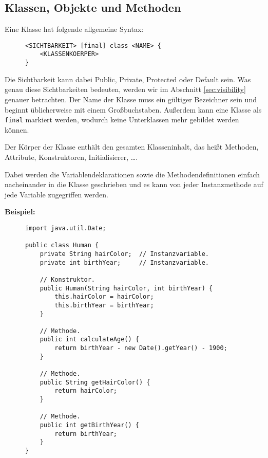 

\subsection{Klassen, Objekte und Methoden}
	
	Eine Klasse hat folgende allgemeine Syntax:
	\begin{figure}[H]
		\centering
		\begin{lstlisting}
<SICHTBARKEIT> [final] class <NAME> {
	<KLASSENKOERPER>
}
\end{lstlisting}
	\end{figure}
	Die Sichtbarkeit kann dabei Public, Private, Protected oder Default sein. Was genau diese Sichtbarkeiten bedeuten, werden wir im Abschnitt \ref{sec:visibility} genauer betrachten. Der Name der Klasse muss ein gültiger Bezeichner sein und beginnt üblicherweise mit einem Großbuchstaben. Außerdem kann eine Klasse als \lstinline|final| markiert werden, wodurch keine Unterklassen mehr gebildet werden können.
	
	Der Körper der Klasse enthält den gesamten Klasseninhalt, das heißt Methoden, Attribute, Konstruktoren, Initialisierer, \dots.
	
	Dabei werden die Variablendeklarationen sowie die Methodendefinitionen einfach nacheinander in die Klasse geschrieben und es kann von jeder Instanzmethode auf jede Variable zugegriffen werden.
	
	\textbf{Beispiel:}
	\begin{figure}[H]
		\centering
		\begin{lstlisting}
import java.util.Date;

public class Human {
	private String hairColor;  // Instanzvariable.
	private int birthYear;     // Instanzvariable.

	// Konstruktor.
	public Human(String hairColor, int birthYear) {
		this.hairColor = hairColor;
		this.birthYear = birthYear;
	}

	// Methode.
	public int calculateAge() {
		return birthYear - new Date().getYear() - 1900;
	}

	// Methode.
	public String getHairColor() {
		return hairColor;
	}

	// Methode.
	public int getBirthYear() {
		return birthYear;
	}
}
\end{lstlisting}
	\end{figure}
	
